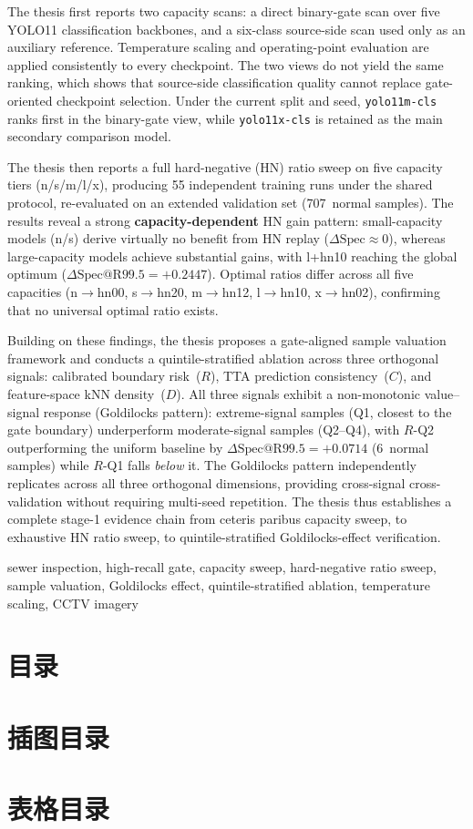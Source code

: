 \documentclass[UTF8,openany,12pt]{ctexbook}
\makeatletter
\renewcommand{\contentsname}{目\quad 录}
\renewcommand{\listfigurename}{插图目录}
\renewcommand{\listtablename}{表格目录}
\newcommand{\engkeywords}[1]{\par\noindent{\bfseries Key words:}#1}
\newcommand{\compactfrontlist}[4]{%
    \chapter*{#1}%
    \pdfbookmark[0]{#2}{#3}%
    {\linespread{1.12}\selectfont\@starttoc{#4}\par}%
}
\makeatother
\begin{document}
The thesis first reports two capacity scans: a direct binary-gate scan over five YOLO11 classification backbones, and a six-class source-side scan used only as an auxiliary reference. Temperature scaling and operating-point evaluation are applied consistently to every checkpoint. The two views do not yield the same ranking, which shows that source-side classification quality cannot replace gate-oriented checkpoint selection. Under the current split and seed, \texttt{yolo11m-cls} ranks first in the binary-gate view, while \texttt{yolo11x-cls} is retained as the main secondary comparison model.

The thesis then reports a full hard-negative (HN) ratio sweep on five capacity tiers (n/s/m/l/x), producing 55 independent training runs under the shared protocol, re-evaluated on an extended validation set (707~normal samples). The results reveal a strong \textbf{capacity-dependent} HN gain pattern: small-capacity models (n/s) derive virtually no benefit from HN replay ($\Delta\mathrm{Spec} \approx 0$), whereas large-capacity models achieve substantial gains, with l+hn10 reaching the global optimum ($\Delta\mathrm{Spec@R99.5} = +0.2447$). Optimal ratios differ across all five capacities (n$\to$hn00, s$\to$hn20, m$\to$hn12, l$\to$hn10, x$\to$hn02), confirming that no universal optimal ratio exists.

Building on these findings, the thesis proposes a gate-aligned sample valuation framework and conducts a quintile-stratified ablation across three orthogonal signals: calibrated boundary risk~($R$), TTA prediction consistency~($C$), and feature-space kNN density~($D$). All three signals exhibit a non-monotonic value--signal response (Goldilocks pattern): extreme-signal samples (Q1, closest to the gate boundary) underperform moderate-signal samples (Q2--Q4), with $R$-Q2 outperforming the uniform baseline by $\Delta\mathrm{Spec@R99.5} = +0.0714$ (6~normal samples) while $R$-Q1 falls \emph{below} it. The Goldilocks pattern independently replicates across all three orthogonal dimensions, providing cross-signal cross-validation without requiring multi-seed repetition. The thesis thus establishes a complete stage-1 evidence chain from ceteris paribus capacity sweep, to exhaustive HN ratio sweep, to quintile-stratified Goldilocks-effect verification.
\engkeywords{sewer inspection, high-recall gate, capacity sweep, hard-negative ratio sweep, sample valuation, Goldilocks effect, quintile-stratified ablation, temperature scaling, CCTV imagery}

\compactfrontlist{\contentsname}{目录}{toc}{toc}
\compactfrontlist{\listfigurename}{插图目录}{lof}{lof}
\compactfrontlist{\listtablename}{表格目录}{lot}{lot}
\end{document}
